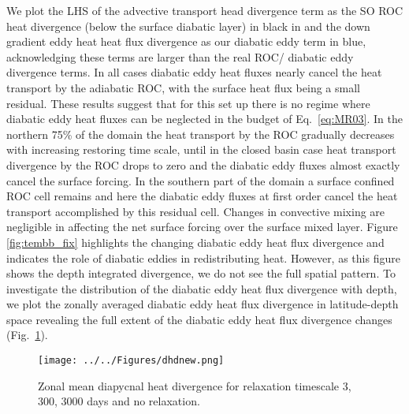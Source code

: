 We plot the LHS of  the advective transport head divergence term as the SO ROC heat divergence (below the surface diabatic layer) in black in  and the down gradient eddy heat heat flux divergence as our diabatic eddy term in blue, acknowledging these terms are larger than the real ROC/ diabatic eddy divergence terms. In all cases diabatic eddy heat fluxes nearly cancel the heat transport by the adiabatic ROC, with the surface heat flux being a small residual. These results suggest that for this set up there is no regime where diabatic eddy heat fluxes can be neglected in the budget of Eq.~\ref{eq:MR03}. In the northern 75\% of the domain the heat transport by the ROC gradually decreases with increasing restoring time scale, until in the closed basin case heat transport divergence by the ROC drops to zero and the diabatic eddy fluxes almost exactly cancel the surface forcing. In the southern part of the domain a surface confined ROC cell remains and here the diabatic eddy fluxes at first order cancel the heat transport accomplished by this residual cell. Changes in convective mixing are negligible in affecting the net surface forcing over the surface mixed layer. Figure \ref{fig:tembb_fix} highlights the changing diabatic eddy heat flux divergence and indicates the role of diabatic eddies in redistributing heat. However, as this figure shows the depth integrated divergence, we do not see the full spatial pattern. To investigate the distribution of the diabatic eddy heat flux divergence with depth, we plot the zonally averaged diabatic eddy heat flux divergence in latitude-depth space revealing the full extent of the diabatic eddy heat flux divergence changes (Fig.~\ref{fig:dhd}). 

\begin{figure}
\noindent \texttt{[image: ../../Figures/dhdnew.png]} 
\caption{Zonal mean diapycnal heat divergence for relaxation timescale 3, 300, 3000 days and no relaxation.}
\label{fig:dhd}
\end{figure}

